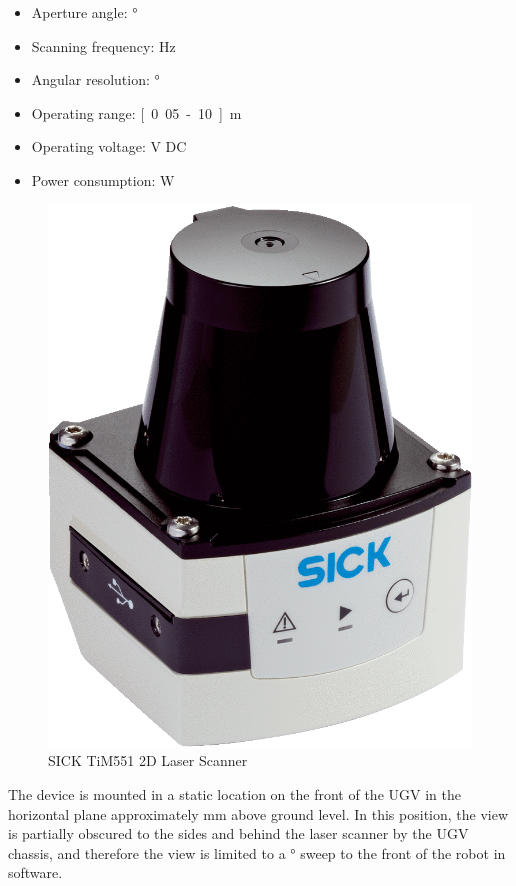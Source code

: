 \documentclass[titlepage,12pt,a4paper]{article}
\begin{document}
\begin{itemize}
	\item Aperture angle: \unit[270]{\degree}
	\item Scanning frequency: \unit[15]{Hz}
	\item Angular resolution: \unit[1]{\degree}
	\item Operating range: \unit[0.05-10]{m}
	\item Operating voltage: \unit[9-28]{V} DC
	\item Power consumption: \unit[3]{W}
\end{itemize}
\begin{figure}[h!]
	\centering
	
	\includegraphics[scale=0.2]{figures/sick_lidar.png}
	\caption{SICK TiM551 2D Laser Scanner}
	\label{figure:sick_lidar}
\end{figure}

The device is mounted in a static location on the front of the UGV in the horizontal plane approximately \unit[300]{mm} above ground level. In this position, the view is partially obscured to the sides and behind the laser scanner by the UGV chassis, and therefore the view is limited to a \unit[150]{\degree} sweep to the front of the robot in software.
\end{document}
